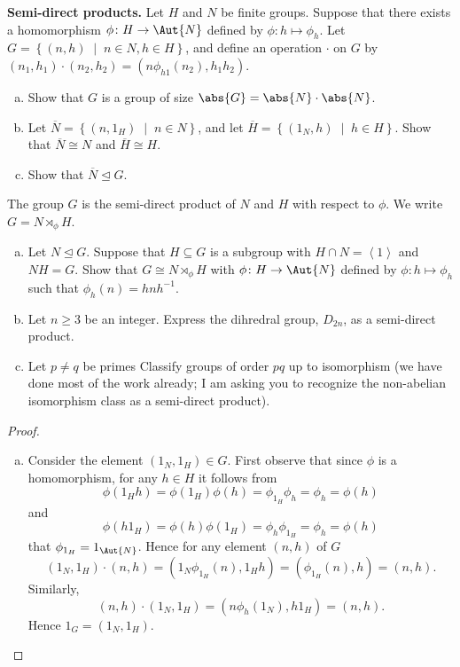 \documentclass[10pt]{amsart}
\begin{document}
\begin{thm}
  {\bf Semi-direct products.}
  Let $H$ and $N$ be finite groups.
  Suppose that there exists a homomorphism $\phi \colon H \rightarrow \Aut{N}$ defined by $\phi \colon h \mapsto \phi_h$.
  Let $G = \left\{ (n,h) \;\middle\vert\; n \in N, h \in H \right\}$, and define an operation $\cdot$ on $G$ by $(n_1,h_1)\cdot(n_2,h_2) = (n\phi_{h1}(n_2), h_1h_2)$.
  \begin{enumerate}[(a)]
  \item
    Show that $G$ is a group of size $\abs{G} = \abs{N}\cdot\abs{N}$.
  \item
    Let $\overline{N} = \left\{(n, 1_H) \;\middle\vert\; n \in N \right\}$, and let $\overline{H} = \left\{(1_N, h) \;\middle\vert\; h \in H \right\}$.
    Show that $\overline{N} \cong N$ and $\overline{H} \cong H$.
  \item
    Show that $\overline{N} \unlhd G$.
    \setcounter{saveenum}{\value{enumi}}
  \end{enumerate}
  The group $G$ is the semi-direct product of $N$ and $H$ with respect to $\phi$.
  We write $G = N \rtimes_\phi H$.
  \begin{enumerate}[(a)]
    \setcounter{enumi}{\value{saveenum}}
  \item
    Let $N \unlhd G$.
    Suppose that $H \subseteq G$ is a subgroup with $H \cap N = \left< 1 \right>$ and $NH = G$.
    Show that $G \cong N \rtimes_\phi H$ with $\phi \colon H \rightarrow \Aut{N}$ defined by $\phi \colon h \mapsto \phi_h$ such that $\phi_h(n) = hnh^{-1}$.
  \item
    Let $n \geq 3$ be an integer.
    Express the dihredral group, $D_{2n}$, as a semi-direct product.
  \item
    Let $p \not = q$ be primes
    Classify groups of order $pq$ up to isomorphism (we have done most of the work already; I am asking you to recognize the non-abelian isomorphism class as a semi-direct product).
  \end{enumerate}
  \begin{proof}
    \begin{enumerate}[(a)]
    \item
      Consider the element $(1_N, 1_H) \in G$.
      First observe that since $\phi$ is a homomorphism, for any $h \in H$ it follows from 
      $$\phi(1_Hh) = \phi(1_H)\phi(h) = \phi_{1_H}\phi_h = \phi_h = \phi(h)$$
      and
      $$\phi(h1_H) = \phi(h)\phi(1_H) = \phi_h\phi_{1_H} = \phi_h = \phi(h)$$
      that $\phi_{1_H} = 1_{\Aut{N}}$.
      Hence for any element $(n,h)$ of $G$
      $$(1_N,1_H) \cdot (n,h) = (1_N \phi_{1_H}(n), 1_Hh) = (\phi_{1_H}(n), h) = (n, h).$$
      Similarly, 
      $$(n,h) \cdot (1_N,1_H) = (n \phi_{h}(1_N), h1_H) = (n, h).$$
      Hence $1_G = (1_N, 1_H)$.
      

\end{enumerate}
\end{proof}
\end{thm}
\end{document}
